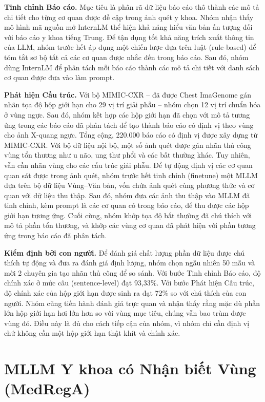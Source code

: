 \documentclass[12pt,a4paper,oneside]{extarticle}
\begin{document}
\noindent\textbf{Tinh chỉnh Báo cáo.} Mục tiêu là phân rã dữ liệu báo cáo thô thành các mô tả
chi tiết cho từng cơ quan được đề cập trong ảnh quét y khoa. Nhóm nhận thấy mô hình mã nguồn mở
InternLM thể hiện khả năng hiểu văn bản ấn tượng đối với báo cáo y khoa tiếng Trung. Để tận dụng
tốt khả năng trích xuất thông tin của LLM, nhóm trước hết áp dụng một chiến lược dựa trên luật
(rule-based) để tóm tắt sơ bộ tất cả các cơ quan được nhắc đến trong báo cáo. Sau đó, nhóm dùng
InternLM để phân tách mỗi báo cáo thành các mô tả chi tiết với danh sách cơ quan được đưa vào
làm prompt.

\noindent\textbf{Phát hiện Cấu trúc.} Với bộ MIMIC-CXR -- đã được Chest ImaGenome gán nhãn tọa
độ hộp giới hạn cho 29 vị trí giải phẫu -- nhóm chọn 12 vị trí chuẩn hóa ở vùng ngực. Sau đó,
nhóm kết hợp các hộp giới hạn đã chọn với mô tả tương ứng trong các báo cáo đã phân tách để tạo
thành báo cáo có định vị theo vùng cho ảnh X-quang ngực. Tổng cộng, 220.000 báo cáo có định vị
được xây dựng từ MIMIC-CXR. Với bộ dữ liệu nội bộ, một số ảnh quét được gán nhãn thủ công vùng
tổn thương như u não, ung thư phổi và các bất thường khác. Tuy nhiên, vẫn cần nhãn vùng cho các
cấu trúc giải phẫu. Để tự động định vị các cơ quan quan sát được trong ảnh quét, nhóm trước hết
tinh chỉnh (finetune) một MLLM dựa trên bộ dữ liệu Vùng--Văn bản, vốn chứa ảnh quét cùng phương
thức và cơ quan với dữ liệu thu thập. Sau đó, nhóm đưa các ảnh thu thập vào MLLM đã tinh chỉnh,
kèm prompt là các cơ quan có trong báo cáo, để thu được các hộp giới hạn tương ứng. Cuối cùng,
nhóm khớp tọa độ bất thường đã chú thích với mô tả phần tổn thương, và khớp các vùng cơ quan đã
phát hiện với phần tương ứng trong báo cáo đã phân tách.

\noindent\textbf{Kiểm định bởi con người.} Để đánh giá chất lượng phần dữ liệu được chú thích
tự động và đưa ra đánh giá định lượng, nhóm chọn ngẫu nhiên 50 mẫu và mời 2 chuyên gia tạo nhãn
thủ công để so sánh. Với bước Tinh chỉnh Báo cáo, độ chính xác ở mức câu (sentence-level) đạt
93,33\%. Với bước Phát hiện Cấu trúc, độ chính xác của hộp giới hạn được sinh ra đạt 72\% so với
chú thích của con người. Nhóm cũng tiến hành đánh giá trực quan và nhận thấy rằng mặc dù phần lớn
hộp giới hạn hơi lớn hơn so với vùng mục tiêu, chúng vẫn bao trùm được vùng đó. Điều này là đủ cho cách
tiếp cận của nhóm, vì nhóm chỉ cần định vị chứ không cần một hộp giới hạn thật khít và chính xác.

\section{MLLM Y khoa có Nhận biết Vùng (MedRegA)}
\end{document}
